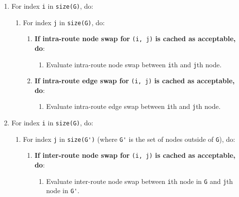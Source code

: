 \documentclass[14pt]{article}
\begin{document}
\begin{enumerate}
	\item For index \verb`i` in \verb`size(G)`, do:
		\begin{enumerate}
			\item For index \verb`j` in \verb`size(G)`, do:
				\begin{enumerate}
					\item \textbf{If intra-route node swap for} \verb`(i, j)` \textbf{is cached as acceptable, do}:
						\begin{enumerate}
							\item Evaluate intra-route node swap between \verb`i`th and
								\verb`j`th node.
						\end{enumerate}
					\item \textbf{If intra-route edge swap for} \verb`(i, j)` \textbf{is cached as acceptable, do}:
						\begin{enumerate}
							\item Evaluate intra-route edge swap between \verb`i`th and
								\verb`j`th node.
						\end{enumerate}
				\end{enumerate}
		\end{enumerate}
	\item For index \verb`i` in \verb`size(G)`, do:
		\begin{enumerate}
			\item For index \verb`j` in \verb`size(G')` (where \verb`G'` is the set of nodes outside of \verb`G`), do:
				\begin{enumerate}
					\item \textbf{If inter-route node swap for} \verb`(i, j)` \textbf{is cached as acceptable, do}:
						\begin{enumerate}
							\item Evaluate inter-route node swap between \verb`i`th
								node in \verb`G` and \verb`j`th node in \verb`G'`.
						\end{enumerate}
				\end{enumerate}
		\end{enumerate}
\end{enumerate}

\newpage
\end{document}
